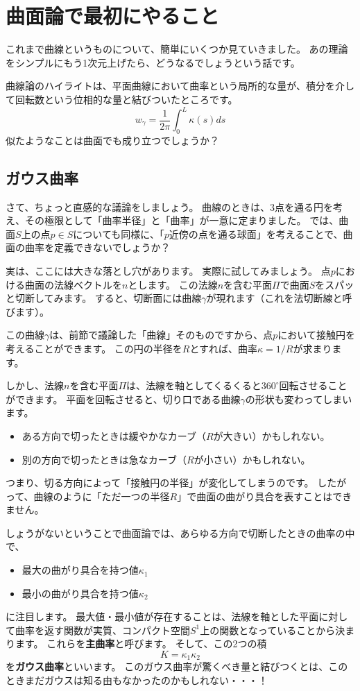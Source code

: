 \chapter{曲面論で最初にやること}

これまで曲線というものについて、簡単にいくつか見ていきました。
あの理論をシンプルにもう1次元上げたら、どうなるでしょうという話です。

曲線論のハイライトは、平面曲線において曲率という局所的な量が、積分を介して回転数という位相的な量と結びついたところです。
\[
  w_\gamma=\frac1{2\pi}\int_0^L\kappa(s)ds
\]
似たようなことは曲面でも成り立つでしょうか？



\section{ガウス曲率}

さて、ちょっと直感的な議論をしましょう。
曲線のときは、3点を通る円を考え、その極限として「曲率半径」と「曲率」が一意に定まりました。
では、曲面$S$上の点$p\in S$についても同様に、「$p$近傍の点を通る球面」を考えることで、曲面の曲率を定義できないでしょうか？

実は、ここには大きな落とし穴があります。
実際に試してみましょう。
点$p$における曲面の法線ベクトルを$n$とします。
この法線$n$を含む平面$\Pi$で曲面$S$をスパッと切断してみます。
すると、切断面には曲線$\gamma$が現れます（これを法切断線と呼びます）。

この曲線$\gamma$は、前節で議論した「曲線」そのものですから、点$p$において接触円を考えることができます。
この円の半径を$R$とすれば、曲率$\kappa=1/R$が求まります。

しかし、法線$n$を含む平面$\Pi$は、法線を軸としてくるくると$360^\circ$回転させることができます。
平面を回転させると、切り口である曲線$\gamma$の形状も変わってしまいます。
\begin{itemize}
  \item ある方向で切ったときは緩やかなカーブ（$R$が大きい）かもしれない。
  \item 別の方向で切ったときは急なカーブ（$R$が小さい）かもしれない。
\end{itemize}
つまり、切る方向によって「接触円の半径」が変化してしまうのです。
したがって、曲線のように「ただ一つの半径$R$」で曲面の曲がり具合を表すことはできません。


しょうがないということで曲面論では、あらゆる方向で切断したときの曲率の中で、
\begin{itemize}
  \item 最大の曲がり具合を持つ値$\kappa_1$
  \item 最小の曲がり具合を持つ値$\kappa_2$
\end{itemize}
に注目します。
最大値・最小値が存在することは、法線を軸とした平面に対して曲率を返す関数が実質、コンパクト空間$S^1$上の関数となっていることから決まります。
これらを\textbf{主曲率}と呼びます。
そして、この2つの積
\[
  K=\kappa_1\kappa_2
\]
を\textbf{ガウス曲率}といいます。
このガウス曲率が驚くべき量と結びつくとは、このときまだガウスは知る由もなかったのかもしれない・・・！



